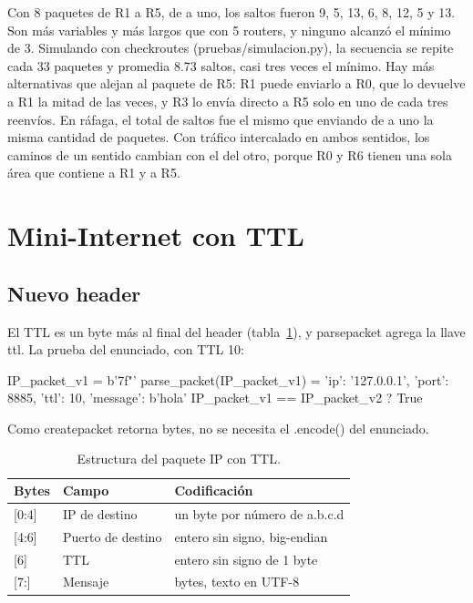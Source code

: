 \documentclass[
	spanish, %
	letterpaper, oneside
]{article}
\newcommand{\codeunderscore}{\textunderscore\allowbreak}
\newcommand{\code}[1]{{\let\_\codeunderscore#1}}     %
\newcommand{\field}[1]{#1}    %
\begin{document}
Con 8 paquetes de R1 a R5, de a uno, los saltos fueron 9, 5, 13, 6, 8, 12, 5 y 13. Son más variables y más largos que con 5 routers, y ninguno alcanzó el mínimo de 3. Simulando con \code{check\_routes} (\code{pruebas/simulacion.py}), la secuencia se repite cada 33 paquetes y promedia 8.73 saltos, casi tres veces el mínimo. Hay más alternativas que alejan al paquete de R5: R1 puede enviarlo a R0, que lo devuelve a R1 la mitad de las veces, y R3 lo envía directo a R5 solo en uno de cada tres reenvíos. En ráfaga, el total de saltos fue el mismo que enviando de a uno la misma cantidad de paquetes. Con tráfico intercalado en ambos sentidos, los caminos de un sentido cambian con el del otro, porque R0 y R6 tienen una sola área que contiene a R1 y a R5.

\section{Mini-Internet con TTL}
\label{sec:con-ttl}

\subsection{Nuevo header}
El TTL es un byte más al final del header (tabla~\ref{tab:header}), y \code{parse\_packet} agrega la llave \field{ttl}. La prueba del enunciado, con TTL 10:
\begin{salida}
IP_packet_v1 = b'\x7f"\nhola'
parse_packet(IP_packet_v1) = {'ip': '127.0.0.1', 'port': 8885, 'ttl': 10, 'message': b'hola'}
IP_packet_v1 == IP_packet_v2 ? True
\end{salida}
Como \code{create\_packet} retorna bytes, no se necesita el \code{.encode()} del enunciado.

\begin{table}[ht]
	\centering
	\caption{Estructura del paquete IP con TTL.}
	\begin{tabular}{lll}
		\hline
		Bytes & Campo & Codificación \\
		\hline
		{[0:4]} & IP de destino & un byte por número de a.b.c.d \\
		{[4:6]} & Puerto de destino & entero sin signo, big-endian \\
		{[6]} & TTL & entero sin signo de 1 byte \\
		{[7:]} & Mensaje & bytes, texto en UTF-8 \\
		\hline
	\end{tabular}
	\label{tab:header}
\end{table}
\end{document}
